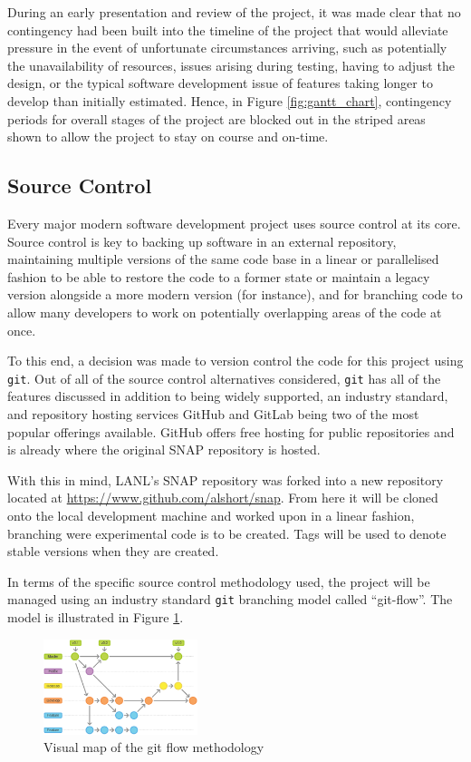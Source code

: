 \documentclass[conference]{IEEEtran}
\begin{document}
During an early presentation and review of the project, it was made clear that no contingency had been built into the timeline of the project that would alleviate pressure in the event of unfortunate circumstances arriving, such as potentially the unavailability of resources, issues arising during testing, having to adjust the design, or the typical software development issue of features taking longer to develop than initially estimated. Hence, in Figure \ref{fig:gantt_chart}, contingency periods for overall stages of the project are blocked out in the striped areas shown to allow the project to stay on course and on-time.

\subsection{Source Control}

Every major modern software development project uses source control at its core. Source control is key to backing up software in an external repository, maintaining multiple versions of the same code base in a linear or parallelised fashion to be able to restore the code to a former state or maintain a legacy version alongside a more modern version (for instance), and for branching code to allow many developers to work on potentially overlapping areas of the code at once.

To this end, a decision was made to version control the code for this project using \texttt{git}. Out of all of the source control alternatives considered, \texttt{git} has all of the features discussed in addition to being widely supported, an industry standard, and repository hosting services GitHub and GitLab being two of the most popular offerings available. GitHub offers free hosting for public repositories and is already where the original SNAP repository is hosted.

With this in mind, LANL's SNAP repository was forked into a new repository located at \url{https://www.github.com/alshort/snap}. From here it will be cloned onto the local development machine and worked upon in a linear fashion, branching were experimental code is to be created. Tags will be used to denote stable versions when they are created.

In terms of the specific source control methodology used, the project will be managed using an industry standard \texttt{git} branching model called ``git-flow''\cite{gitflow}. The model is illustrated in Figure \ref{fig:gitflow}.

\begin{figure}[!h]
    \centering
    \includegraphics[width=0.4\textwidth]{images/gitflow.png}
    \caption{Visual map of the git flow methodology}
    \label{fig:gitflow}
\end{figure}
\end{document}
